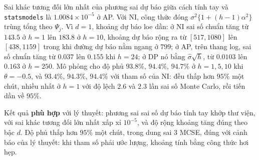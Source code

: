  Sai khác tương đối lớn nhất của phương sai dự báo giữa cách tính tay và \texttt{statsmodels} là $1.0084\times10^{-5}$ ở AP. Với NI, công thức đóng $\sigma^2\{1+(h-1)\alpha^2\}$ trùng tổng theo $\Psi_j$. Vì $d=1$, khoảng dự báo loe dần: ở NI sai số chuẩn tăng từ $143.5$ ở $h=1$ lên $183.8$ ở $h=10$, khoảng dự báo rộng ra từ $[517,1080]$ lên $[438,1159]$ trong khi đường dự báo nằm ngang ở $799$; ở AP, trên thang log, sai số chuẩn tăng từ $0.037$ lên $0.155$ khi $h=24$; ở DP nó bằng $\hat\sigma\sqrt h$, từ $0.0103$ lên $0.163$ ở $h=250$. Mô phỏng cho độ phủ $93.8\%$, $94.4\%$, $94.7\%$ ở $h=1,5,10$ khi $\theta=-0.5$, và $93.4\%$, $94.3\%$, $94.4\%$ với tham số của NI: đều thấp hơn $95\%$ một chút, nhiều nhất ở $h=1$ với độ lệch $2.6$ và $2.3$ lần sai số Monte Carlo, rồi tiến dần về $95\%$.

 Kết quả \textbf{phù hợp} với lý thuyết: phương sai sai số dự báo tính tay khớp thư viện, với sai khác tương đối lớn nhất xấp xỉ $10^{-5}$, và độ rộng khoảng tăng đúng theo bậc $d$. Độ phủ thấp hơn $95\%$ một chút, trong dung sai $3$ MCSE, đúng với cảnh báo của lý thuyết: khi tham số phải ước lượng, khoảng tính bằng công thức hơi hẹp.

